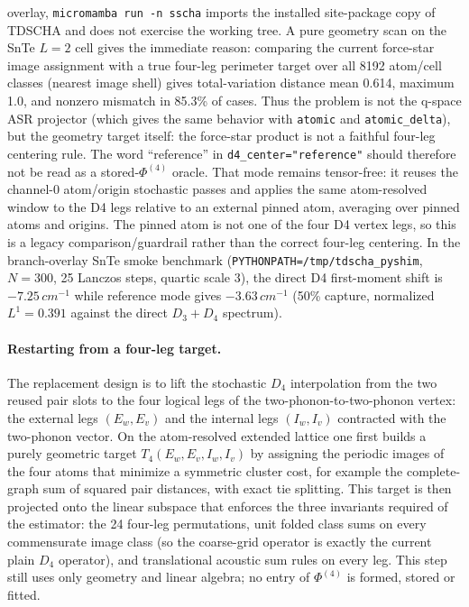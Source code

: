 \documentclass[11pt,a4paper]{article}
\begin{document}
overlay, \texttt{micromamba run -n sscha} imports the installed
site-package copy of TDSCHA and does not exercise the working tree.  A
pure geometry scan on the SnTe $L=2$ cell gives the immediate reason:
comparing the current force-star image
assignment with a true four-leg perimeter target over all 8192 atom/cell
classes (nearest image shell) gives total-variation distance mean 0.614,
maximum 1.0, and nonzero mismatch in 85.3\% of cases.  Thus the problem is
not the q-space ASR projector (which gives the same behavior with
\texttt{atomic} and \texttt{atomic\_delta}), but the geometry target
itself: the force-star product is not a faithful four-leg centering rule.
The word ``reference'' in \texttt{d4\_center="reference"} should therefore
not be read as a stored-$\Phi^{(4)}$ oracle.  That mode remains tensor-free:
it reuses the channel-0 atom/origin stochastic passes and applies the same
atom-resolved window to the D4 legs relative to an external pinned atom,
averaging over pinned atoms and origins.  The pinned atom is not one of the
four D4 vertex legs, so this is a legacy comparison/guardrail rather than the
correct four-leg centering.  In the branch-overlay SnTe smoke benchmark
(\texttt{PYTHONPATH=/tmp/tdscha\_pyshim}, $N=300$, 25 Lanczos steps,
quartic scale $3$), the direct D4 first-moment shift is
$-7.25\,\si{cm^{-1}}$ while reference mode gives
$-3.63\,\si{cm^{-1}}$ (50\% capture, normalized $L^1=0.391$ against the
direct $D_3{+}D_4$ spectrum).

\paragraph{Restarting from a four-leg target.}
The replacement design is to lift the stochastic $D_4$ interpolation from
the two reused pair slots to the four logical legs of the
two-phonon-to-two-phonon vertex: the external legs $(E_w,E_v)$ and the
internal legs $(I_w,I_v)$ contracted with the two-phonon vector.  On the
atom-resolved extended lattice one first builds a purely geometric target
$T_4(E_w,E_v,I_w,I_v)$ by assigning the periodic images of the four atoms
that minimize a symmetric cluster cost, for example the complete-graph sum
of squared pair distances, with exact tie splitting.  This target is then
projected onto the linear subspace that enforces the three invariants
required of the estimator: the 24 four-leg permutations, unit folded class
sums on every commensurate image class (so the coarse-grid operator is
exactly the current plain $D_4$ operator), and translational acoustic sum
rules on every leg.  This step still uses only geometry and linear algebra;
no entry of $\Phi^{(4)}$ is formed, stored or fitted.
\end{document}
